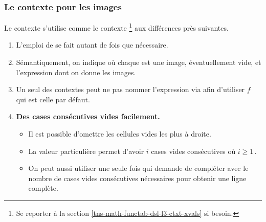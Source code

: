 \documentclass[10pt, a4paper]{tutodoc}
\begin{document}

\subsubsection{Le contexte  pour les images}
\label{tns-math-functab-dsl-l3-ctxt-imgs}

Le contexte  s'utilise comme le contexte 
\footnote{
    Se reporter à la section \ref{tns-math-functab-dsl-l3-ctxt-xvals} si besoin.
}
aux différences près suivantes.
%
\begin{enumerate}
    \item L'emploi de  se fait autant de fois que nécessaire.


    \item Sémantiquement, on indique  où chaque  est une image, éventuellement vide, et  l'expression dont on donne les images.


    \item Un seul des contextes peut ne pas nommer l'expression via  afin d'utiliser $f$ qui est celle par défaut.


    \item \textbf{Des cases consécutives vides facilement.}
    \begin{itemize}
    	\item Il est possible d'omettre les cellules vides les plus à droite.

    	\item La valeur particulière  permet d'avoir $i$ cases vides consécutives où $i \geq 1$\,.

    	\item On peut aussi utiliser une seule fois  qui demande de compléter avec le nombre de cases vides consécutives nécessaires pour obtenir une ligne complète.
    \end{itemize}
\end{enumerate}
\end{document}
